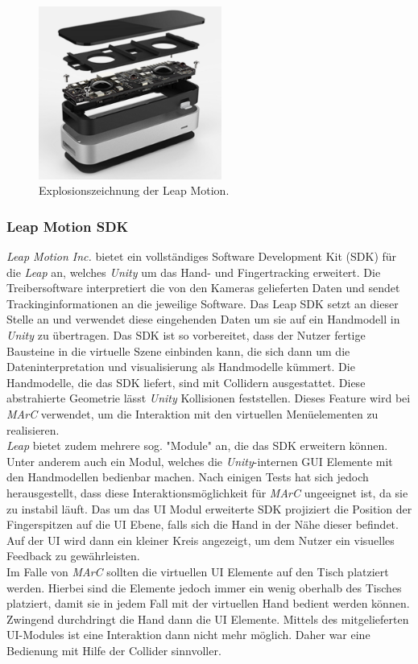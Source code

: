 \begin{figure}[H]
	\centering
	\includegraphics[width=6cm]{Bilder/leap-motion.png}			
		\caption{Explosionszeichnung der Leap Motion.~\cite{website:LeapMotionBlog}}
		\label{fig:leapMotion}
\end{figure}

\subsubsection{Leap Motion SDK} \label{sec:LeapSDK}
\textit{Leap Motion Inc.} bietet ein vollständiges Software Development Kit (SDK) für die \textit{Leap} an, welches \textit{Unity} um das Hand- und Fingertracking erweitert. Die Treibersoftware interpretiert die von den Kameras gelieferten Daten und sendet Trackinginformationen an die jeweilige Software. Das Leap SDK setzt an dieser Stelle an und verwendet diese eingehenden Daten um sie auf ein Handmodell in \textit{Unity} zu übertragen. Das SDK ist so vorbereitet, dass der Nutzer fertige Bausteine in die virtuelle Szene einbinden kann, die sich dann um die Dateninterpretation und visualisierung als Handmodelle kümmert. Die Handmodelle, die das SDK liefert, sind mit Collidern ausgestattet. Diese abstrahierte Geometrie lässt \textit{Unity} Kollisionen feststellen. Dieses Feature wird bei \textit{MArC} verwendet, um die Interaktion mit den virtuellen Menüelementen zu realisieren.\\
\textit{Leap} bietet zudem mehrere sog. "Module" an, die das SDK erweitern können. Unter anderem auch ein Modul, welches die \textit{Unity}-internen GUI Elemente mit den Handmodellen bedienbar machen. Nach einigen Tests hat sich jedoch herausgestellt, dass diese Interaktionsmöglichkeit für \textit{MArC} ungeeignet ist, da sie zu instabil läuft. Das um das UI Modul erweiterte SDK projiziert die Position der Fingerspitzen auf die UI Ebene, falls sich die Hand in der Nähe dieser befindet. Auf der UI wird dann ein kleiner Kreis angezeigt, um dem Nutzer ein visuelles Feedback zu gewährleisten.\\
Im Falle von \textit{MArC} sollten die virtuellen UI Elemente auf den Tisch platziert werden. Hierbei sind die Elemente jedoch immer ein wenig oberhalb des Tisches platziert, damit sie in jedem Fall mit der virtuellen Hand bedient werden können. Zwingend durchdringt die Hand dann die UI Elemente. Mittels des mitgelieferten UI-Modules ist eine Interaktion dann nicht mehr möglich. Daher war eine Bedienung mit Hilfe der Collider sinnvoller.

